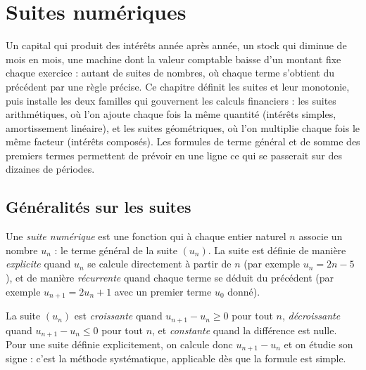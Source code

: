 \chapter{Suites numériques}

\begin{quelqueslignes}
Un capital qui produit des intérêts année après année, un stock qui diminue de mois en mois, une machine dont la valeur comptable baisse d'un montant fixe chaque exercice : autant de suites de nombres, où chaque terme s'obtient du précédent par une règle précise. Ce chapitre définit les suites et leur monotonie, puis installe les deux familles qui gouvernent les calculs financiers : les suites arithmétiques, où l'on ajoute chaque fois la même quantité (intérêts simples, amortissement linéaire), et les suites géométriques, où l'on multiplie chaque fois le même facteur (intérêts composés). Les formules de terme général et de somme des premiers termes permettent de prévoir en une ligne ce qui se passerait sur des dizaines de périodes.
\end{quelqueslignes}

\section{Généralités sur les suites}

\begin{definition}
Une \emph{suite numérique} est une fonction qui à chaque entier naturel $n$ associe un nombre $u_{n}$ : le terme général de la suite $(u_{n})$. La suite est définie de manière \emph{explicite} quand $u_{n}$ se calcule directement à partir de $n$ (par exemple $u_{n} = 2n - 5$), et de manière \emph{récurrente} quand chaque terme se déduit du précédent (par exemple $u_{n+1} = 2u_{n} + 1$ avec un premier terme $u_{0}$ donné).
\end{definition}

\begin{propriete}
La suite $(u_{n})$ est \emph{croissante} quand $u_{n+1} - u_{n} \geqslant 0$ pour tout $n$, \emph{décroissante} quand $u_{n+1} - u_{n} \leqslant 0$ pour tout $n$, et \emph{constante} quand la différence est nulle. Pour une suite définie explicitement, on calcule donc $u_{n+1} - u_{n}$ et on étudie son signe : c'est la méthode systématique, applicable dès que la formule est simple.
\end{propriete}

